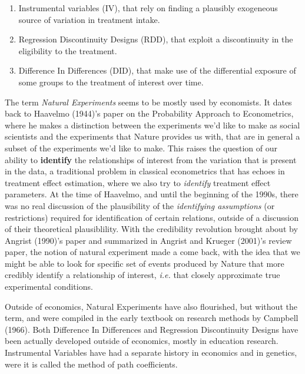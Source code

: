 \documentclass[]{book}
\providecommand{\tightlist}{%
  \setlength{\itemsep}{0pt}\setlength{\parskip}{0pt}}
\theoremstyle{definition}
\theoremstyle{definition}
\theoremstyle{definition}
\theoremstyle{remark}
\let\BeginKnitrBlock\begin \let\EndKnitrBlock\end
\begin{document}
\begin{enumerate}
\def\labelenumi{\arabic{enumi}.}
\tightlist
\item
  Instrumental variables (IV), that rely on finding a plausibly exogeneous source of variation in treatment intake.
\item
  Regression Discontinuity Designs (RDD), that exploit a discontinuity in the eligibility to the treatment.
\item
  Difference In Differences (DID), that make use of the differential exposure of some groups to the treatment of interest over time.
\end{enumerate}

\BeginKnitrBlock{remark}
\iffalse{} {Remark. } \fi{}The term \emph{Natural Experiments} seems to be mostly used by economists.
It dates back to Haavelmo (1944)'s paper on the Probability Approach to Econometrics, where he makes a distinction between the experiments we'd like to make as social scientists and the experiments that Nature provides us with, that are in general a subset of the experiments we'd like to make.
This raises the question of our ability to \textbf{identify} the relationships of interest from the variation that is present in the data, a traditional problem in classical econometrics that has echoes in treatment effect estimation, where we also try to \emph{identify} treatment effect parameters.
At the time of Haavelmo, and until the beginning of the 1990s, there was no real discussion of the plausibility of the \emph{identifying assumptions} (or restrictions) required for identification of certain relations, outside of a discussion of their theoretical plausiblility.
With the credibility revolution brought about by Angrist (1990)'s paper and summarized in Angrist and Krueger (2001)'s review paper, the notion of natural experiment made a come back, with the idea that we might be able to look for specific set of events produced by Nature that more credibly identify a relationship of interest, \emph{i.e.} that closely approximate true experimental conditions.
\EndKnitrBlock{remark}

\BeginKnitrBlock{remark}
\iffalse{} {Remark. } \fi{}Outside of economics, Natural Experiments have also flourished, but without the term, and were compiled in the early textbook on research methods by Campbell (1966).
Both Difference In Differences and Regression Discontinuity Designs have been actually developed outside of economics, mostly in education research.
Instrumental Variables have had a separate history in economics and in genetics, were it is called the method of path coefficients.
\EndKnitrBlock{remark}
\end{document}
